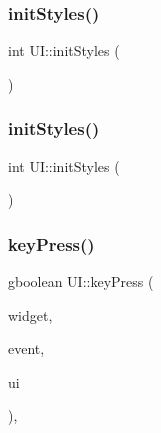 \mbox{\label{class_u_i_a2405c93cf8c14f22ebc20de45116e52b}} 
\subsubsection{\texorpdfstring{init\+Styles()}{initStyles()}\hspace{0.1cm}{\footnotesize\ttfamily [1/2]}}
{\footnotesize\ttfamily int U\+I\+::init\+Styles (\begin{DoxyParamCaption}{ }\end{DoxyParamCaption})\hspace{0.3cm}{\ttfamily [private]}}

\mbox{\label{class_u_i_a2405c93cf8c14f22ebc20de45116e52b}} 
\subsubsection{\texorpdfstring{init\+Styles()}{initStyles()}\hspace{0.1cm}{\footnotesize\ttfamily [2/2]}}
{\footnotesize\ttfamily int U\+I\+::init\+Styles (\begin{DoxyParamCaption}{ }\end{DoxyParamCaption})\hspace{0.3cm}{\ttfamily [private]}}

\mbox{\label{class_u_i_ae9d1de9359a28d1ec13f2824ec72420c}} 
\subsubsection{\texorpdfstring{key\+Press()}{keyPress()}\hspace{0.1cm}{\footnotesize\ttfamily [1/2]}}
{\footnotesize\ttfamily gboolean U\+I\+::key\+Press (\begin{DoxyParamCaption}\item[{Gtk\+Widget $\ast$}]{widget,  }\item[{Gdk\+Event\+Key $\ast$}]{event,  }\item[{\hyperlink{class_u_i}{UI} $\ast$}]{ui }\end{DoxyParamCaption})\hspace{0.3cm}{\ttfamily [static]}, {\ttfamily [private]}}

